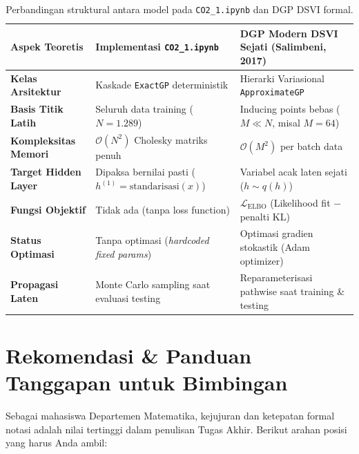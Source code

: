 \documentclass[11pt,a4paper]{article}
\begin{document}
\begin{table}[H]
\centering
\small
\renewcommand{\arraystretch}{1.25}
\begin{tabularx}{\textwidth}{p{3.2cm} X X}
\toprule
\textbf{Aspek Teoretis} & \textbf{Implementasi \texttt{CO2\_1.ipynb}} & \textbf{DGP Modern DSVI Sejati (Salimbeni, 2017)} \\
\midrule
\textbf{Kelas Arsitektur} & Kaskade \texttt{ExactGP} deterministik & Hierarki Variasional \texttt{ApproximateGP} \\
\textbf{Basis Titik Latih} & Seluruh data training ($N = 1.289$) & Inducing points bebas ($M \ll N$, misal $M = 64$) \\
\textbf{Kompleksitas Memori} & $\mathcal{O}(N^2)$ Cholesky matriks penuh & $\mathcal{O}(M^2)$ per batch data \\
\textbf{Target Hidden Layer} & Dipaksa bernilai pasti ($h^{(1)} = \text{standarisasi}(x)$) & Variabel acak laten sejati ($h \sim q(h)$) \\
\textbf{Fungsi Objektif} & Tidak ada (tanpa loss function) & $\mathcal{L}_{\mathrm{ELBO}}$ (Likelihood fit $-$ penalti KL) \\
\textbf{Status Optimasi} & Tanpa optimasi (\textit{hardcoded fixed params}) & Optimasi gradien stokastik (Adam optimizer) \\
\textbf{Propagasi Laten} & Monte Carlo sampling saat evaluasi testing & Reparameterisasi pathwise saat training \& testing \\
\bottomrule
\end{tabularx}
\caption{Perbandingan struktural antara model pada \texttt{CO2\_1.ipynb} dan DGP DSVI formal.}
\label{tab:komparasi}
\end{table}

\vspace{0.2cm}

\section{Rekomendasi \& Panduan Tanggapan untuk Bimbingan}
\label{sec:rekomendasi}

\noindent Sebagai mahasiswa Departemen Matematika, kejujuran dan ketepatan formal notasi adalah nilai tertinggi dalam penulisan Tugas Akhir. Berikut arahan posisi yang harus Anda ambil:
\end{document}
